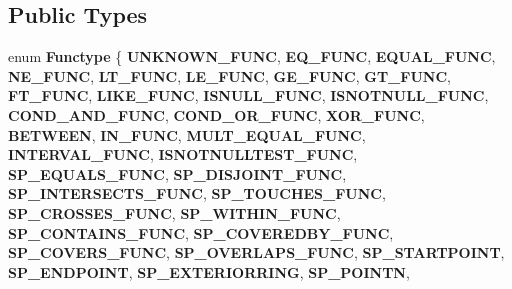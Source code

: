\subsection*{Public Types}
\begin{DoxyCompactItemize}
\item 
\mbox{\label{classItem__func_a44783465b41db99f2cff936cb7b6e70b}} 
enum {\bfseries Functype} \{ \newline
{\bfseries U\+N\+K\+N\+O\+W\+N\+\_\+\+F\+U\+NC}, 
{\bfseries E\+Q\+\_\+\+F\+U\+NC}, 
{\bfseries E\+Q\+U\+A\+L\+\_\+\+F\+U\+NC}, 
{\bfseries N\+E\+\_\+\+F\+U\+NC}, 
\newline
{\bfseries L\+T\+\_\+\+F\+U\+NC}, 
{\bfseries L\+E\+\_\+\+F\+U\+NC}, 
{\bfseries G\+E\+\_\+\+F\+U\+NC}, 
{\bfseries G\+T\+\_\+\+F\+U\+NC}, 
\newline
{\bfseries F\+T\+\_\+\+F\+U\+NC}, 
{\bfseries L\+I\+K\+E\+\_\+\+F\+U\+NC}, 
{\bfseries I\+S\+N\+U\+L\+L\+\_\+\+F\+U\+NC}, 
{\bfseries I\+S\+N\+O\+T\+N\+U\+L\+L\+\_\+\+F\+U\+NC}, 
\newline
{\bfseries C\+O\+N\+D\+\_\+\+A\+N\+D\+\_\+\+F\+U\+NC}, 
{\bfseries C\+O\+N\+D\+\_\+\+O\+R\+\_\+\+F\+U\+NC}, 
{\bfseries X\+O\+R\+\_\+\+F\+U\+NC}, 
{\bfseries B\+E\+T\+W\+E\+EN}, 
\newline
{\bfseries I\+N\+\_\+\+F\+U\+NC}, 
{\bfseries M\+U\+L\+T\+\_\+\+E\+Q\+U\+A\+L\+\_\+\+F\+U\+NC}, 
{\bfseries I\+N\+T\+E\+R\+V\+A\+L\+\_\+\+F\+U\+NC}, 
{\bfseries I\+S\+N\+O\+T\+N\+U\+L\+L\+T\+E\+S\+T\+\_\+\+F\+U\+NC}, 
\newline
{\bfseries S\+P\+\_\+\+E\+Q\+U\+A\+L\+S\+\_\+\+F\+U\+NC}, 
{\bfseries S\+P\+\_\+\+D\+I\+S\+J\+O\+I\+N\+T\+\_\+\+F\+U\+NC}, 
{\bfseries S\+P\+\_\+\+I\+N\+T\+E\+R\+S\+E\+C\+T\+S\+\_\+\+F\+U\+NC}, 
{\bfseries S\+P\+\_\+\+T\+O\+U\+C\+H\+E\+S\+\_\+\+F\+U\+NC}, 
\newline
{\bfseries S\+P\+\_\+\+C\+R\+O\+S\+S\+E\+S\+\_\+\+F\+U\+NC}, 
{\bfseries S\+P\+\_\+\+W\+I\+T\+H\+I\+N\+\_\+\+F\+U\+NC}, 
{\bfseries S\+P\+\_\+\+C\+O\+N\+T\+A\+I\+N\+S\+\_\+\+F\+U\+NC}, 
{\bfseries S\+P\+\_\+\+C\+O\+V\+E\+R\+E\+D\+B\+Y\+\_\+\+F\+U\+NC}, 
\newline
{\bfseries S\+P\+\_\+\+C\+O\+V\+E\+R\+S\+\_\+\+F\+U\+NC}, 
{\bfseries S\+P\+\_\+\+O\+V\+E\+R\+L\+A\+P\+S\+\_\+\+F\+U\+NC}, 
{\bfseries S\+P\+\_\+\+S\+T\+A\+R\+T\+P\+O\+I\+NT}, 
{\bfseries S\+P\+\_\+\+E\+N\+D\+P\+O\+I\+NT}, 
\newline
{\bfseries S\+P\+\_\+\+E\+X\+T\+E\+R\+I\+O\+R\+R\+I\+NG}, 
{\bfseries S\+P\+\_\+\+P\+O\+I\+N\+TN}, 

\end{DoxyCompactItemize}
